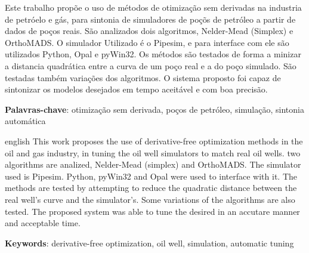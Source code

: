 
\setlength{\absparsep}{18pt} %
\begin{resumo}

Este trabalho propõe o uso de métodos de otimização sem derivadas na industria de petróelo e gás, para sintonia de simuladores de poçõs de petróleo a partir de dados de poços reais. São analizados dois algoritmos, Nelder-Mead (Simplex) e OrthoMADS.
O simulador Utilizado é o Pipesim, e para interface com ele são utilizados Python, Opal e pyWin32.
Os métodos são testados de forma a minizar a distancia quadrática entre a curva de um poço real e a do poço simulado. São testadas também variações dos algoritmos.
O sistema proposto foi capaz de sintonizar os modelos desejados em tempo aceitável e com boa precisão.


 \textbf{Palavras-chave}: otimização sem derivada, poços de petróleo, simulação, sintonia automática 
\end{resumo}

\begin{resumo}[Abstract]
 \begin{otherlanguage*}{english}
This work proposes the use of derivative-free optimization methods in the oil and gas industry, in tuning the oil well simulators to match real oil wells. two algorithms are analized, Nelder-Mead (simplex) and OrthoMADS.
The simulator used is Pipesim. Python, pyWin32 and Opal were used to interface with it.
The methods are tested by attempting to reduce the quadratic distance between the real well's curve and the simulator's.
Some variations of the algorithms are also tested.
The proposed system was able to tune the desired in an accutare manner and acceptable time.


   \vspace{\onelineskip}
 
   \noindent 
   \textbf{Keywords}: derivative-free optimization, oil well, simulation, automatic tuning
 \end{otherlanguage*}
\end{resumo}
